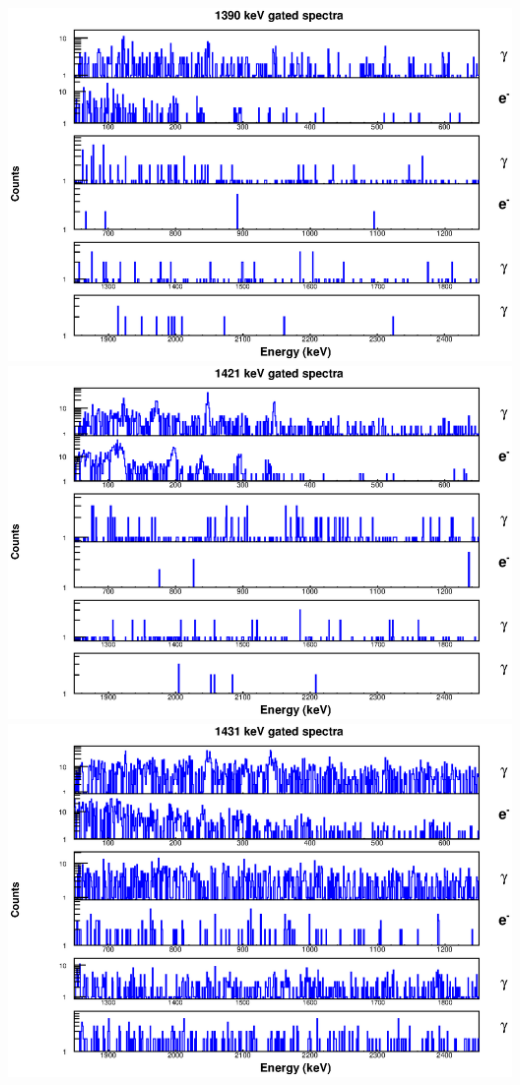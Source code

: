 \includegraphics[scale=0.8]{154Gd_Appendix/1390_combined.eps}
\includegraphics[scale=0.8]{154Gd_Appendix/1421_combined.eps}
\includegraphics[scale=0.8]{154Gd_Appendix/1431_combined.eps}

